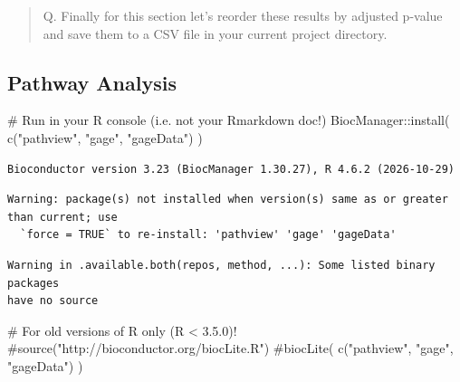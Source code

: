 \documentclass[
  letterpaper,
  DIV=11,
  numbers=noendperiod]{scrartcl}
\newenvironment{Shaded}{\begin{snugshade}}{\end{snugshade}}
\newcommand{\AttributeTok}[1]{\textcolor[rgb]{0.40,0.45,0.13}{#1}}
\newcommand{\CommentTok}[1]{\textcolor[rgb]{0.37,0.37,0.37}{#1}}
\newcommand{\FunctionTok}[1]{\textcolor[rgb]{0.28,0.35,0.67}{#1}}
\newcommand{\NormalTok}[1]{\textcolor[rgb]{0.00,0.23,0.31}{#1}}
\newcommand{\OtherTok}[1]{\textcolor[rgb]{0.00,0.23,0.31}{#1}}
\newcommand{\SpecialCharTok}[1]{\textcolor[rgb]{0.37,0.37,0.37}{#1}}
\newcommand{\StringTok}[1]{\textcolor[rgb]{0.13,0.47,0.30}{#1}}
\begin{document}
\begin{quote}
Q. Finally for this section let's reorder these results by adjusted
p-value and save them to a CSV file in your current project directory.
\end{quote}

\begin{Shaded}
\end{Shaded}

\subsection{Pathway Analysis}\label{pathway-analysis}

\begin{Shaded}
\begin{Highlighting}[]
\CommentTok{\# Run in your R console (i.e. not your Rmarkdown doc!)}
\NormalTok{BiocManager}\SpecialCharTok{::}\FunctionTok{install}\NormalTok{( }\FunctionTok{c}\NormalTok{(}\StringTok{"pathview"}\NormalTok{, }\StringTok{"gage"}\NormalTok{, }\StringTok{"gageData"}\NormalTok{) )}
\end{Highlighting}
\end{Shaded}

\begin{verbatim}
Bioconductor version 3.23 (BiocManager 1.30.27), R 4.6.2 (2026-10-29)
\end{verbatim}

\begin{verbatim}
Warning: package(s) not installed when version(s) same as or greater than current; use
  `force = TRUE` to re-install: 'pathview' 'gage' 'gageData'
\end{verbatim}

\begin{verbatim}
Warning in .available.both(repos, method, ...): Some listed binary packages
have no source
\end{verbatim}

\begin{Shaded}
\begin{Highlighting}[]
\CommentTok{\# For old versions of R only (R \textless{} 3.5.0)!}
\CommentTok{\#source("http://bioconductor.org/biocLite.R")}
\CommentTok{\#biocLite( c("pathview", "gage", "gageData") )}
\end{Highlighting}
\end{Shaded}
\end{document}
